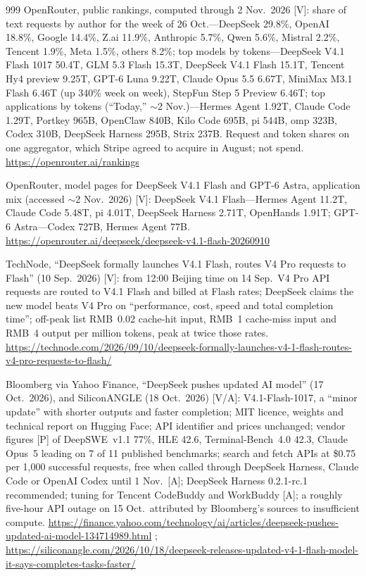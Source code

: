 \begin{thebibliography}{999}
 OpenRouter, public rankings, computed through 2 Nov.\ 2026 [V]: share of text requests by author for the week of 26 Oct.---DeepSeek 29.8\%, OpenAI 18.8\%, Google 14.4\%, Z.ai 11.9\%, Anthropic 5.7\%, Qwen 5.6\%, Mistral 2.2\%, Tencent 1.9\%, Meta 1.5\%, others 8.2\%; top models by tokens---DeepSeek V4.1 Flash 1017 50.4T, GLM 5.3 Flash 15.3T, DeepSeek V4.1 Flash 15.1T, Tencent Hy4 preview 9.25T, GPT-6 Luna 9.22T, Claude Opus 5.5 6.67T, MiniMax M3.1 Flash 6.46T (up 340\% week on week), StepFun Step 5 Preview 6.46T; top applications by tokens (``Today,'' $\sim$2 Nov.)---Hermes Agent 1.92T, Claude Code 1.29T, Portkey 965B, OpenClaw 840B, Kilo Code 695B, pi 544B, omp 323B, Codex 310B, DeepSeek Harness 295B, Strix 237B. Request and token shares on one aggregator, which Stripe agreed to acquire in August; not spend. \url{https://openrouter.ai/rankings}

 OpenRouter, model pages for DeepSeek V4.1 Flash and GPT-6 Astra, application mix (accessed $\sim$2 Nov.\ 2026) [V]: DeepSeek V4.1 Flash---Hermes Agent 11.2T, Claude Code 5.48T, pi 4.01T, DeepSeek Harness 2.71T, OpenHands 1.91T; GPT-6 Astra---Codex 727B, Hermes Agent 77B. \url{https://openrouter.ai/deepseek/deepseek-v4.1-flash-20260910}

 TechNode, ``DeepSeek formally launches V4.1 Flash, routes V4 Pro requests to Flash'' (10 Sep.\ 2026) [V]: from 12:00 Beijing time on 14 Sep.\ V4 Pro API requests are routed to V4.1 Flash and billed at Flash rates; DeepSeek claims the new model beats V4 Pro on ``performance, cost, speed and total completion time''; off-peak list RMB~0.02 cache-hit input, RMB~1 cache-miss input and RMB~4 output per million tokens, peak at twice those rates. \url{https://technode.com/2026/09/10/deepseek-formally-launches-v4-1-flash-routes-v4-pro-requests-to-flash/}

 Bloomberg via Yahoo Finance, ``DeepSeek pushes updated AI model'' (17 Oct.\ 2026), and SiliconANGLE (18 Oct.\ 2026) [V/A]: V4.1-Flash-1017, a ``minor update'' with shorter outputs and faster completion; MIT licence, weights and technical report on Hugging Face; API identifier and prices unchanged; vendor figures [P] of DeepSWE~v1.1 77\%, HLE 42.6, Terminal-Bench~4.0 42.3, Claude Opus~5 leading on 7 of 11 published benchmarks; search and fetch APIs at \$0.75 per 1,000 successful requests, free when called through DeepSeek Harness, Claude Code or OpenAI Codex until 1 Nov.\ [A]; DeepSeek Harness 0.2.1-rc.1 recommended; tuning for Tencent CodeBuddy and WorkBuddy [A]; a roughly five-hour API outage on 15 Oct.\ attributed by Bloomberg's sources to insufficient compute. \url{https://finance.yahoo.com/technology/ai/articles/deepseek-pushes-updated-ai-model-134714989.html} ; \url{https://siliconangle.com/2026/10/18/deepseek-releases-updated-v4-1-flash-model-it-says-completes-tasks-faster/}


\end{thebibliography}
